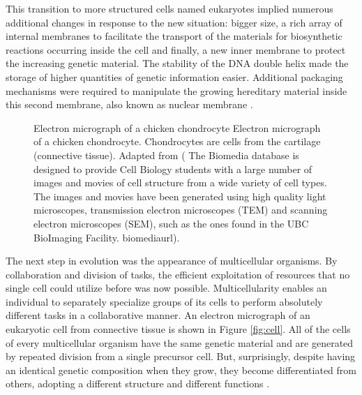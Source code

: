 This transition to more structured cells named eukaryotes 
%
implied numerous additional changes 
in response to the new situation: bigger size, a rich array of internal membranes to facilitate 
the transport of the materials for biosynthetic reactions occurring inside the cell and 
finally, a new inner membrane to protect the increasing genetic material. The stability of the 
DNA double helix made the storage of higher quantities of genetic information easier. Additional 
packaging mechanisms were required to manipulate the growing hereditary material inside 
this second membrane, also known as nuclear membrane \citep{alberts:1994a}. 

\begin{figure}[t!]
\begin{center}
\setlength{\fboxsep}{0pt}
          {Electron micrograph of a chicken chondrocyte}%
          {Electron micrograph of a chicken chondrocyte.}%
          {Chondrocytes are cells from the cartilage (connective tissue).
           Adapted from 
           (
            {}
            {The Biomedia database is designed to provide Cell Biology students with a large number of images and movies of cell structure from a wide variety of cell types. The images and movies have been generated using high quality light microscopes, transmission electron microscopes (TEM) and scanning electron microscopes (SEM), such as the ones found in the UBC BioImaging Facility.}
            {biomediaurl}).}
\end{center}
\end{figure}

The next step in evolution was the appearance of multicellular organisms. 
%
By collaboration
and division of tasks, the efficient exploitation of resources that no single cell could 
utilize before was now possible. Multicellularity enables an individual to separately specialize 
groups of its cells to perform absolutely different tasks in a collaborative manner. An electron 
micrograph of an eukaryotic cell from connective tissue is shown in Figure \ref{fig:cell}.
All of the cells of every multicellular organism have the same genetic material and are generated 
by repeated division from a single precursor cell. But, surprisingly, despite having an identical 
genetic composition when they grow, they become differentiated from others, adopting a different structure
and different functions \citep{alberts:1994a}.

